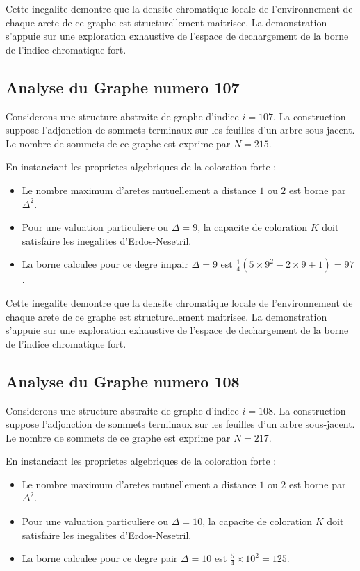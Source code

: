 \documentclass[11pt,a4paper]{article}
\begin{document}
Cette inegalite demontre que la densite chromatique locale de l'environnement de chaque arete de ce graphe est structurellement maitrisee. La demonstration s'appuie sur une exploration exhaustive de l'espace de dechargement de la borne de l'indice chromatique fort.

\subsection{Analyse du Graphe numero 107}
Considerons une structure abstraite de graphe d'indice $i = 107$. La construction suppose l'adjonction de sommets terminaux sur les feuilles d'un arbre sous-jacent. Le nombre de sommets de ce graphe est exprime par $N = 215$.

En instanciant les proprietes algebriques de la coloration forte :
\begin{itemize}
\item Le nombre maximum d'aretes mutuellement a distance $1$ ou $2$ est borne par $\Delta^2$.
\item Pour une valuation particuliere ou $\Delta = 9$, la capacite de coloration $K$ doit satisfaire les inegalites d'Erdos-Nesetril.
\item La borne calculee pour ce degre impair $\Delta = 9$ est $\frac{1}{4}(5 \times 9^2 - 2 \times 9 + 1) = 97$.
\end{itemize}

Cette inegalite demontre que la densite chromatique locale de l'environnement de chaque arete de ce graphe est structurellement maitrisee. La demonstration s'appuie sur une exploration exhaustive de l'espace de dechargement de la borne de l'indice chromatique fort.

\subsection{Analyse du Graphe numero 108}
Considerons une structure abstraite de graphe d'indice $i = 108$. La construction suppose l'adjonction de sommets terminaux sur les feuilles d'un arbre sous-jacent. Le nombre de sommets de ce graphe est exprime par $N = 217$.

En instanciant les proprietes algebriques de la coloration forte :
\begin{itemize}
\item Le nombre maximum d'aretes mutuellement a distance $1$ ou $2$ est borne par $\Delta^2$.
\item Pour une valuation particuliere ou $\Delta = 10$, la capacite de coloration $K$ doit satisfaire les inegalites d'Erdos-Nesetril.
\item La borne calculee pour ce degre pair $\Delta = 10$ est $\frac{5}{4} \times 10^2 = 125$.
\end{itemize}
\end{document}
